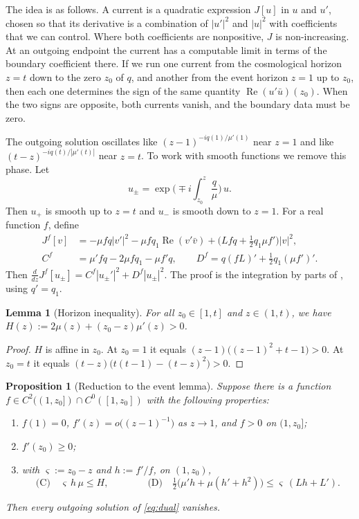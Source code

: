 \documentclass[11pt]{amsart}
\newtheorem{proposition}[theorem]{Proposition}
\newtheorem{lemma}[theorem]{Lemma}
\theoremstyle{definition}
\theoremstyle{remark}
\numberwithin{equation}{section}
\renewcommand{\Re}{\operatorname{Re}}
\begin{document}
The idea is as follows. A current is a quadratic expression $J[u]$ in $u$ and $u'$, chosen so that its derivative is
a combination of $|u'|^2$ and $|u|^2$ with coefficients that we can control. Where both coefficients are
nonpositive, $J$ is non-increasing. At an outgoing endpoint the current has a computable limit in terms of the
boundary coefficient there. If we run one current from the cosmological horizon $z=t$ down to the zero $z_0$ of $q$,
and another from the event horizon $z=1$ up to $z_0$, then each one determines the sign of the same quantity
$\Re(u'\bar u)(z_0)$. When the two signs are opposite, both currents vanish, and the boundary data must be zero.

The outgoing solution oscillates like $(z-1)^{-iq(1)/\mu'(1)}$ near $z=1$ and like $(t-z)^{-iq(t)/|\mu'(t)|}$ near $z=t$.
To work with smooth functions we remove this phase. Let
\[
u_\pm=\exp\Big(\mp i\int_{z_0}^z\frac{q}{\mu}\Big)\,u .
\]
Then $u_+$ is smooth up to $z=t$ and $u_-$ is smooth down to $z=1$. For a real function $f$, define
\begin{align*}
J^f[v]&=-\mu fq|v'|^2-\mu fq_1\Re(v'\bar v)+\big(Lfq+\tfrac12q_1\mu f'\big)|v|^2,\\
C^f&=\mu'fq-2\mu fq_1-\mu f'q,\qquad D^f=q(fL)'+\tfrac12q_1(\mu f')'.
\end{align*}
Then $\frac{d}{dz}J^f[u_\pm]=C^f|u_\pm'|^2+D^f|u_\pm|^2$. The proof is the integration by parts of
\cite[Lemma~4.1]{Hin26}, using $q'=q_1$.

\begin{lemma}[Horizon inequality]\label{lem:H}
For all $z_0\in[1,t]$ and $z\in(1,t)$, we have $H(z):=2\mu(z)+(z_0-z)\mu'(z)>0$.
\end{lemma}
\begin{proof}
$H$ is affine in $z_0$. At $z_0=1$ it equals $(z-1)\big((z-1)^2+t-1\big)>0$. At $z_0=t$ it equals
$(t-z)\big(t(t-1)-(t-z)^2\big)>0$.
\end{proof}

\begin{proposition}[Reduction to the event lemma]\label{prop:reduction}
Suppose there is a function $f\in C^2((1,z_0])\cap C^0([1,z_0])$ with the following properties:
\begin{enumerate}[label=(\alph*)]
\item $f(1)=0$, $f'(z)=o\big((z-1)^{-1}\big)$ as $z\to1$, and $f>0$ on $(1,z_0]$;
\item $f'(z_0)\ge0$;
\item with $\varsigma:=z_0-z$ and $h:=f'/f$, on $(1,z_0)$,
\begin{equation}\label{eq:CD}
\text{(C)}\quad \varsigma\,h\,\mu\le H,\qquad\qquad \text{(D)}\quad \tfrac12\big(\mu'h+\mu(h'+h^2)\big)\le \varsigma\,(Lh+L').
\end{equation}
\end{enumerate}
Then every outgoing solution of \eqref{eq:dual} vanishes.
\end{proposition}
\end{document}

